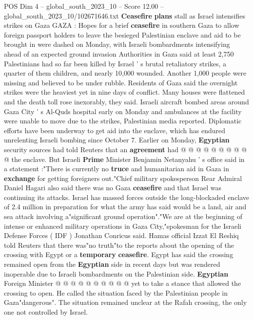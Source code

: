 \begin{textsample}{POS Dim 4 – global\_south\_2023\_10 – Score 12.00 – global\_south\_2023\_10/102671646.txt}  \label{ex:f4_pos_428}
\textbf{Ceasefire} \textbf{plans} stall as Israel intensifies strikes on Gaza GAZA : Hopes for a brief \textbf{ceasefire} in southern Gaza to allow foreign passport holders to leave the besieged Palestinian enclave and aid to be brought in were dashed on Monday, with Israeli bombardments intensifying ahead of an expected ground invasion Authorities in Gaza said at least 2,750 Palestinians had so far been killed by Israel ' s brutal retaliatory strikes, a quarter of them children, and nearly 10,000 wounded.
Another 1,000 people were missing and believed to be under rubble.
Residents of Gaza said the overnight strikes were the heaviest yet in nine days of conflict.
Many houses were flattened and the death toll rose inexorably, they said.
Israeli aircraft bombed areas around Gaza City ' s Al-Quds hospital early on Monday and ambulances at the facility were unable to move due to the strikes, Palestinian media reported.
Diplomatic efforts have been underway to get aid into the enclave, which has endured unrelenting Israeli bombing since October 7.
Earlier on Monday, \textbf{Egyptian} security sources had told Reuters that an \textbf{agreement} had @ @ @ @ @ @ @ @ @ @ the enclave.
But Israeli \textbf{Prime} Minister Benjamin Netanyahu ' s office said in a statement :"There is currently no \textbf{truce} and humanitarian aid in Gaza in \textbf{exchange} for getting foreigners out."Chief military spokesperson Rear Admiral Daniel Hagari also said there was no Gaza \textbf{ceasefire} and that Israel was continuing its attacks.
Israel has massed forces outside the long-blockaded enclave of 2.4 million in preparation for what the army has said would be a land, air and sea attack involving a"significant ground operation"."We are at the beginning of intense or enhanced military operations in Gaza City,"spokesman for the Israeli Defense Forces ( IDF ) Jonathan Conricus said.
Hamas official Izzat El Reshiq told Reuters that there was"no truth"to the reports about the opening of the crossing with Egypt or a \textbf{temporary} \textbf{ceasefire}.
Egypt has said the crossing remained open from the \textbf{Egyptian} side in recent days but was rendered inoperable due to Israeli bombardments on the Palestinian side. \textbf{Egyptian} Foreign Minister @ @ @ @ @ @ @ @ @ @ yet to take a stance that allowed the crossing to open.
He called the situation faced by the Palestinian people in Gaza"dangerous".
The situation remained unclear at the Rafah crossing, the only one not controlled by Israel.

\end{textsample}
